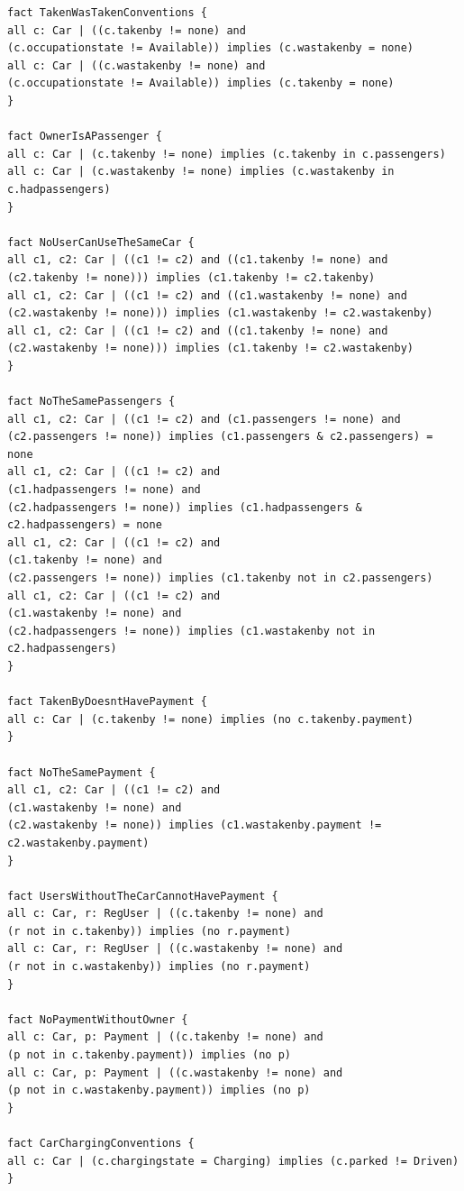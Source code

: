 \documentclass[12pt, letterpaper]{article}
\begin{document}
\begin{verbatim}
fact TakenWasTakenConventions {
all c: Car | ((c.takenby != none) and 
(c.occupationstate != Available)) implies (c.wastakenby = none)
all c: Car | ((c.wastakenby != none) and 
(c.occupationstate != Available)) implies (c.takenby = none)
}

fact OwnerIsAPassenger {
all c: Car | (c.takenby != none) implies (c.takenby in c.passengers)
all c: Car | (c.wastakenby != none) implies (c.wastakenby in c.hadpassengers)
}

fact NoUserCanUseTheSameCar {
all c1, c2: Car | ((c1 != c2) and ((c1.takenby != none) and 
(c2.takenby != none))) implies (c1.takenby != c2.takenby)
all c1, c2: Car | ((c1 != c2) and ((c1.wastakenby != none) and 
(c2.wastakenby != none))) implies (c1.wastakenby != c2.wastakenby)
all c1, c2: Car | ((c1 != c2) and ((c1.takenby != none) and 
(c2.wastakenby != none))) implies (c1.takenby != c2.wastakenby)
}

fact NoTheSamePassengers {
all c1, c2: Car | ((c1 != c2) and (c1.passengers != none) and 
(c2.passengers != none)) implies (c1.passengers & c2.passengers) = none
all c1, c2: Car | ((c1 != c2) and 
(c1.hadpassengers != none) and 
(c2.hadpassengers != none)) implies (c1.hadpassengers & c2.hadpassengers) = none
all c1, c2: Car | ((c1 != c2) and 
(c1.takenby != none) and 
(c2.passengers != none)) implies (c1.takenby not in c2.passengers)
all c1, c2: Car | ((c1 != c2) and
(c1.wastakenby != none) and 
(c2.hadpassengers != none)) implies (c1.wastakenby not in c2.hadpassengers)
}

fact TakenByDoesntHavePayment {
all c: Car | (c.takenby != none) implies (no c.takenby.payment)
}

fact NoTheSamePayment {
all c1, c2: Car | ((c1 != c2) and 
(c1.wastakenby != none) and 
(c2.wastakenby != none)) implies (c1.wastakenby.payment != c2.wastakenby.payment)
}

fact UsersWithoutTheCarCannotHavePayment {
all c: Car, r: RegUser | ((c.takenby != none) and 
(r not in c.takenby)) implies (no r.payment)  
all c: Car, r: RegUser | ((c.wastakenby != none) and 
(r not in c.wastakenby)) implies (no r.payment)  
}

fact NoPaymentWithoutOwner {
all c: Car, p: Payment | ((c.takenby != none) and 
(p not in c.takenby.payment)) implies (no p)  
all c: Car, p: Payment | ((c.wastakenby != none) and 
(p not in c.wastakenby.payment)) implies (no p)  
}

fact CarChargingConventions {
all c: Car | (c.chargingstate = Charging) implies (c.parked != Driven)
}


\end{verbatim}
\end{document}

